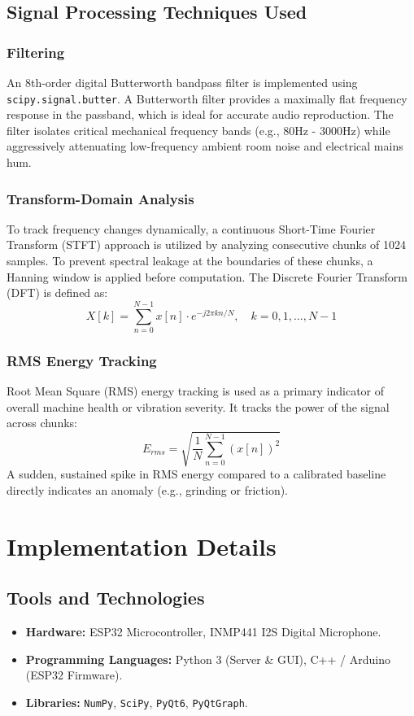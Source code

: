 \documentclass[11pt,a4paper]{article}
\begin{document}
\subsection{Signal Processing Techniques Used}

\subsubsection{Filtering}
An 8th-order digital Butterworth bandpass filter is implemented using \texttt{scipy.signal.butter}. A Butterworth filter provides a maximally flat frequency response in the passband, which is ideal for accurate audio reproduction. The filter isolates critical mechanical frequency bands (e.g., 80Hz - 3000Hz) while aggressively attenuating low-frequency ambient room noise and electrical mains hum.

\subsubsection{Transform-Domain Analysis}
To track frequency changes dynamically, a continuous Short-Time Fourier Transform (STFT) approach is utilized by analyzing consecutive chunks of 1024 samples. To prevent spectral leakage at the boundaries of these chunks, a Hanning window is applied before computation. The Discrete Fourier Transform (DFT) is defined as:
\begin{equation}
X[k] = \sum_{n=0}^{N-1} x[n] \cdot e^{-j2\pi kn/N}, \quad k = 0, 1, \ldots, N-1
\end{equation}

\subsubsection{RMS Energy Tracking}
Root Mean Square (RMS) energy tracking is used as a primary indicator of overall machine health or vibration severity. It tracks the power of the signal across chunks:
\begin{equation}
E_{rms} = \sqrt{\frac{1}{N} \sum_{n=0}^{N-1} (x[n])^2}
\end{equation}
A sudden, sustained spike in RMS energy compared to a calibrated baseline directly indicates an anomaly (e.g., grinding or friction).

\section{Implementation Details}
\subsection{Tools and Technologies}
\begin{itemize}
    \item \textbf{Hardware:} ESP32 Microcontroller, INMP441 I2S Digital Microphone.
    \item \textbf{Programming Languages:} Python 3 (Server \& GUI), C++ / Arduino (ESP32 Firmware).
    \item \textbf{Libraries:} \texttt{NumPy}, \texttt{SciPy}, \texttt{PyQt6}, \texttt{PyQtGraph}.
\end{itemize}
\end{document}
